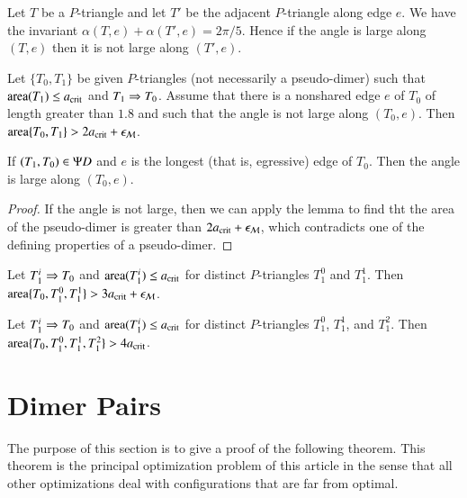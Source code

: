 Let $T$ be a $P$-triangle and let $T'$ be the adjacent $P$-triangle
along edge $e$.  We have the invariant
$\alpha(T,e)+\alpha(T',e)=2\pi/5$.  Hence if the angle is large along
$(T,e)$ then it is not large along $(T',e)$.


\begin{lemma}
  Let $\{T_0,T_1\}$ be given $P$-triangles (not necessarily a
  pseudo-dimer) such that ${\operatorname{area}}(T_1)\le a_\text{crit}$ and $T_1\Rightarrow T_0$.
  Assume that there is a nonshared edge $e$ of $T_0$ of length greater
  than $1.8$ and such that the angle is not large along $(T_0,e)$.  Then
  ${\operatorname{area}}\{T_0,T_1\} > 2a_\text{crit} + \epsilon_{\mathcal M}$.
\end{lemma}

\begin{corollary}
  If $(T_1,T_0)\in \Psi D$ and $e$ is the longest (that is, egressive)
  edge of $T_0$.  Then the angle is large along $(T_0,e)$.
\end{corollary}

\begin{proof} 
  If the angle is not large, then we can apply the lemma to find tht
  the area of the pseudo-dimer is greater than $2a_\text{crit} + \epsilon_{\mathcal M}$,
  which contradicts one of the defining properties of a pseudo-dimer.
\end{proof}

\begin{lemma}
  Let $T_1^i\Rightarrow T_0$ and ${\operatorname{area}}(T_1^i)\le a_\text{crit}$  for
  distinct $P$-triangles $T_1^0$ and $T_1^1$.  Then
  ${\operatorname{area}}\{T_0,T_1^0,T_1^1\} > 3a_\text{crit} + \epsilon_{\mathcal M}$.
\end{lemma}

\begin{lemma}
  Let $T_1^i\Rightarrow T_0$ and ${\operatorname{area}}(T_1^i)\le a_\text{crit}$ for distinct
  $P$-triangles $T_1^0$, $T_1^1$, and $T_1^2$.  Then
  ${\operatorname{area}}\{T_0,T_1^0,T_1^1,T_1^2\} > 4a_\text{crit}$.
\end{lemma}


\section{Dimer Pairs}

The purpose of this section is to give a proof of the following
theorem.  This theorem is the principal optimization problem of this
article in the sense that all other optimizations deal with
configurations that are far from optimal.


